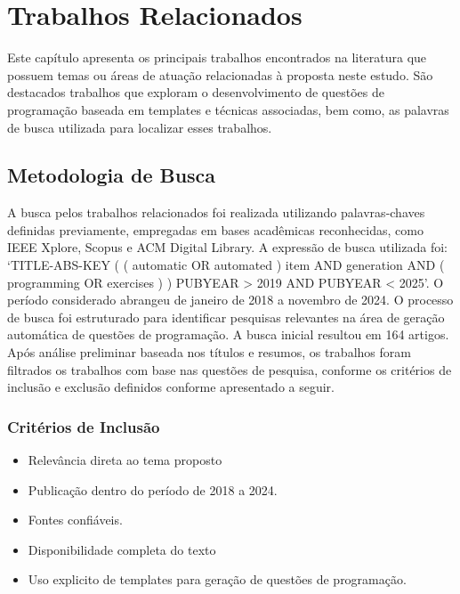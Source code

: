
\chapter{Trabalhos Relacionados}\label{cap:trabalhos-relacionados}

Este capítulo apresenta os principais trabalhos encontrados na literatura que possuem temas ou áreas de atuação relacionadas à proposta neste estudo. São destacados trabalhos que exploram o desenvolvimento de questões de programação baseada em templates e técnicas associadas, bem como, as palavras de busca utilizada para localizar esses trabalhos.



\section{Metodologia de Busca}

A busca pelos trabalhos relacionados foi realizada utilizando palavras-chaves definidas previamente, empregadas em bases acadêmicas reconhecidas, como IEEE Xplore, Scopus e ACM Digital Library. A expressão de busca utilizada foi: `TITLE-ABS-KEY ( ( automatic OR automated ) item AND generation AND ( programming OR exercises ) ) PUBYEAR > 2019 AND PUBYEAR < 2025'. O período considerado abrangeu de janeiro de 2018 a novembro de 2024.  O processo de busca foi estruturado para identificar pesquisas relevantes na área de geração automática de questões de programação. A busca inicial resultou em 164 artigos. Após análise preliminar baseada nos títulos e resumos, os trabalhos foram filtrados  os trabalhos com base nas questões de pesquisa, conforme os critérios de inclusão e exclusão definidos conforme apresentado a seguir. 

\subsection{Critérios de Inclusão}
\begin{itemize}
    \item Relevância direta ao tema proposto
    \item Publicação dentro do período de 2018 a 2024.
    \item Fontes confiáveis.
    \item Disponibilidade completa do texto
    \item Uso explicito de templates para geração de questões de programação.
\end{itemize}

